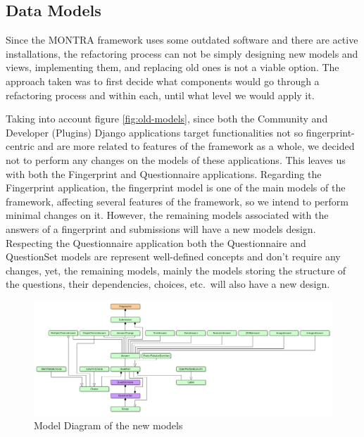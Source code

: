 \subsection{Data Models}

Since the MONTRA framework uses some outdated software and there are active installations, the refactoring process can not be simply designing new models and views, implementing them, and replacing old ones is not a viable option.
The approach taken was to first decide what components would go through a refactoring process and within each, until what level we would apply it.

Taking into account figure \ref{fig:old-models}, since both the Community and Developer (Plugins) Django applications target functionalities not so fingerprint-centric and are more related to features of the framework as a whole, we decided not to perform any changes on the models of these applications.
This leaves us with both the Fingerprint and Questionnaire applications.
Regarding the Fingerprint application, the fingerprint model is one of the main models of the framework, affecting several features of the framework, so we intend to perform minimal changes on it.
However, the remaining models associated with the answers of a fingerprint and submissions will have a new models design.
Respecting the Questionnaire application both the Questionnaire and QuestionSet models are represent well-defined concepts and don't require any changes, yet, the remaining models, mainly the models storing the structure of the questions, their dependencies, choices, etc.\, will also have a new design.

\begin{figure}
    \center
    \includegraphics[width=\textwidth]{new-models}
    \caption{Model Diagram of the new models}
    \label{fig:new-models}
\end{figure}

